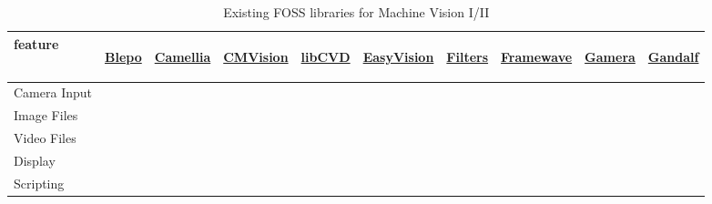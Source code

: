 \documentclass[12pt,a4paper,oneside,openright]{book}
\newcommand{\tick}{\ding{52}} %
\newcommand{\xxxx}{}
\begin{document}
\begin{CJK}{UTF8}{}
\begin{table}[htbp]
  \begin{center}
    \caption{Existing \acs{FOSS} libraries for Machine Vision I/II\label{tbl:foss1}}\vspace{1em}
    \begin{tabular}{l|ccccccccc}\toprule
      \textbf{feature} &
      \begin{sideways}\href{http://www.ces.clemson.edu/~stb/blepo/}{\textbf{Blepo}}\end{sideways} &
      \begin{sideways}\href{http://camellia.sourceforge.net/}{\textbf{Camellia}}\end{sideways} &
      \begin{sideways}\href{http://www.cs.cmu.edu/~jbruce/cmvision/}{\textbf{CMVision}}\end{sideways} &
      \begin{sideways}\href{http://mi.eng.cam.ac.uk/~er258/cvd/}{\textbf{libCVD}}\end{sideways} &
      \begin{sideways}\href{http://www.easyvision.googlepages.com/}{\textbf{EasyVision}}\end{sideways} &
      \begin{sideways}\href{http://filters.sourceforge.net/}{\textbf{Filters}}\end{sideways} &
      \begin{sideways}\href{http://framewave.sourceforge.net/}{\textbf{Framewave}}\end{sideways} &
      \begin{sideways}\href{http://gamera.informatik.hsnr.de/}{\textbf{Gamera}}\end{sideways} &
      \begin{sideways}\href{http://gandalf-library.sourceforge.net/}{\textbf{Gandalf}}\end{sideways}\\\midrule
      Camera Input         & \tick & \xxxx & \tick & \tick & \tick & \xxxx & \xxxx & \xxxx & \xxxx \\
      Image Files          & \tick & \tick & \xxxx & \tick & \tick & \tick & \tick & \tick & \tick \\
      Video Files          & \xxxx & \xxxx & \xxxx & \tick & \xxxx & \xxxx & \tick & \xxxx & \xxxx \\
      Display              & \tick & \xxxx & \tick & \tick & \tick & \xxxx & \xxxx & \tick & \tick \\
      Scripting            & \xxxx & \tick & \xxxx & \xxxx & \tick & \xxxx & \xxxx & \tick & \xxxx \\

\end{tabular}
\end{center}
\end{table}
\end{CJK}
\end{document}
